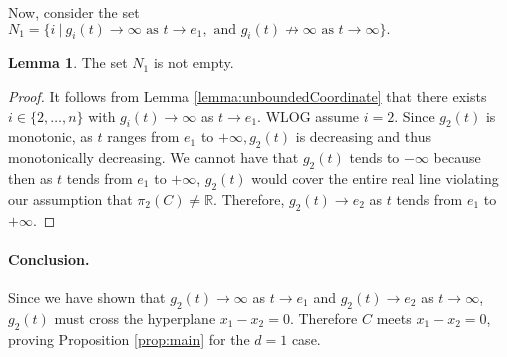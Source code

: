 \documentclass[10pt]{article}
\theoremstyle{definition}
\newtheorem{lemma}{Lemma}
\newcommand{\R}{\mathbb{R}}
\def\ms#1{\textcolor{olive}{#1}}
\begin{document}
%
\noindent
Now, consider the set $N_1 = \big\{i~|~g_i(t) \rightarrow \infty \textrm{ as } t \rightarrow e_1, \textrm{ and } g_i(t) \not \rightarrow \infty \textrm{ as } t \rightarrow \infty\big\}.$
%
\begin{lemma}
    The set $N_1$ is not empty. 
\end{lemma}
%
\begin{proof}
It follows from Lemma \ref{lemma:unboundedCoordinate} that there exists $i \in \{2,\hdots,n\}$ with $g_i(t) \rightarrow \infty$ as $t
\rightarrow e_1$.
WLOG assume $i=2.$ Since
$g_2(t)$ is monotonic, as $t$ ranges from $e_1$ to $+\infty, g_2(t)$ is decreasing and thus monotonically decreasing. We cannot have that $g_2(t)$ tends to $-\infty$ because then as $t$ tends from $e_1$ to $+\infty$, $g_2(t)$ would cover the entire real line violating our assumption that $\pi_2(C) \not = \R$. Therefore, $g_2(t) \rightarrow e_2$ as $t$ tends from $e_1$ to $+\infty$.
\end{proof}
%







\paragraph*{Conclusion.}
Since we have shown that $g_2(t) \rightarrow \infty$ as $t \rightarrow e_1$ and $g_2(t) \rightarrow e_2$ as $t \rightarrow \infty$, $g_2(t)$ must cross the hyperplane $x_1-x_2=0$.  Therefore $C$ meets $x_1-x_2=0$, proving Proposition \ref{prop:main} for the $d=1$ case.  





\end{document}
